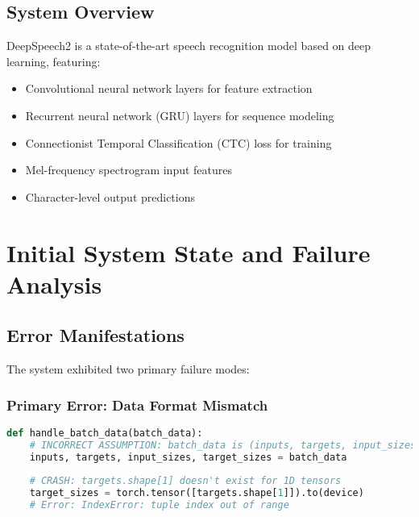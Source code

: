 \documentclass[11pt,a4paper]{article}
\begin{document}
\subsection{System Overview}
DeepSpeech2 is a state-of-the-art speech recognition model based on deep learning, featuring:
\begin{itemize}
    \item Convolutional neural network layers for feature extraction
    \item Recurrent neural network (GRU) layers for sequence modeling
    \item Connectionist Temporal Classification (CTC) loss for training
    \item Mel-frequency spectrogram input features
    \item Character-level output predictions
\end{itemize}

\section{Initial System State and Failure Analysis}

\subsection{Error Manifestations}
The system exhibited two primary failure modes:

\subsubsection{Primary Error: Data Format Mismatch}
\begin{lstlisting}[language=Python, caption=Original Broken Code]
def handle_batch_data(batch_data):
    # INCORRECT ASSUMPTION: batch_data is (inputs, targets, input_sizes, target_sizes)
    inputs, targets, input_sizes, target_sizes = batch_data
    
    # CRASH: targets.shape[1] doesn't exist for 1D tensors
    target_sizes = torch.tensor([targets.shape[1]]).to(device)
    # Error: IndexError: tuple index out of range
\end{lstlisting}
\end{document}
